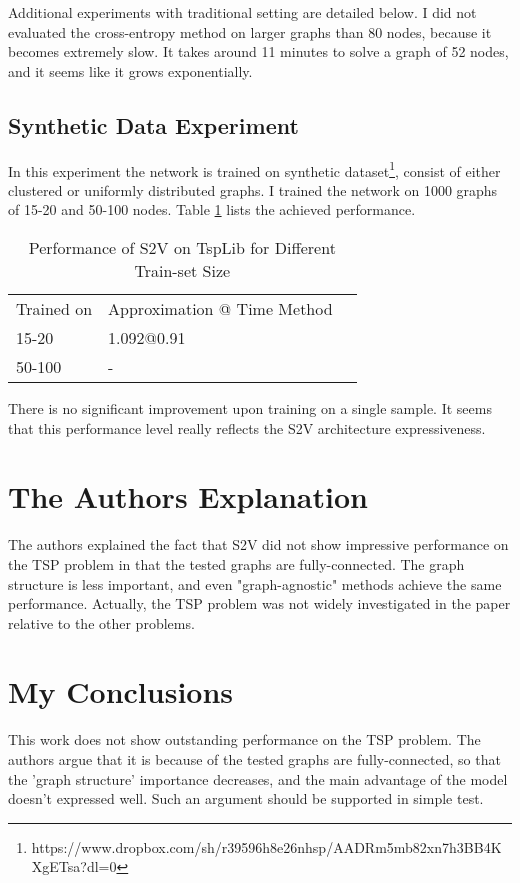 \documentclass[10pt,a4paper,draft]{article}
\begin{document}
	Additional experiments with traditional setting are detailed below. I did not evaluated the cross-entropy method on larger graphs than 80 nodes, because it becomes extremely slow. It takes around 11 minutes to solve a graph of 52 nodes, and it seems like it grows exponentially.
	

\subsection{Synthetic Data Experiment}
In this experiment the network is trained on synthetic dataset\footnote{https://www.dropbox.com/sh/r39596h8e26nhsp/AADRm5mb82xn7h3BB4KXgETsa?dl=0}, consist of either clustered or uniformly distributed graphs.
I trained the network on 1000 graphs of 15-20 and 50-100 nodes. Table \ref{tb_tsp2d_performance_s2v} lists the achieved performance. 

\begin{table}[h] \centering
	\begin{tabular}{lll}
	 	Trained on		& Approximation @ Time Method 	\\
	 	15-20	 		& 1.092@0.91					\\
		50-100			& - 
	\end{tabular}
	\caption{Performance of S2V on TspLib for Different Train-set Size} 
	\label{tb_tsp2d_performance_s2v}
\end{table}

There is no significant improvement upon training on a single sample. It seems that this performance level really reflects the S2V architecture expressiveness.
	


\section{The Authors Explanation}
	The authors explained the fact that S2V did not show impressive performance on the TSP problem in that the tested graphs are fully-connected. The graph structure is less important, and even "graph-agnostic" methods achieve the same performance. 
	Actually, the TSP problem was not widely investigated in the paper relative to the other problems.

\section{My Conclusions}
	This work does not show outstanding performance on the TSP problem. The authors argue that it is because of the tested graphs are fully-connected, so that the 'graph structure' importance decreases, and the main advantage of the model doesn't expressed well. Such an argument should be supported in simple test. 
	
\end{document}
